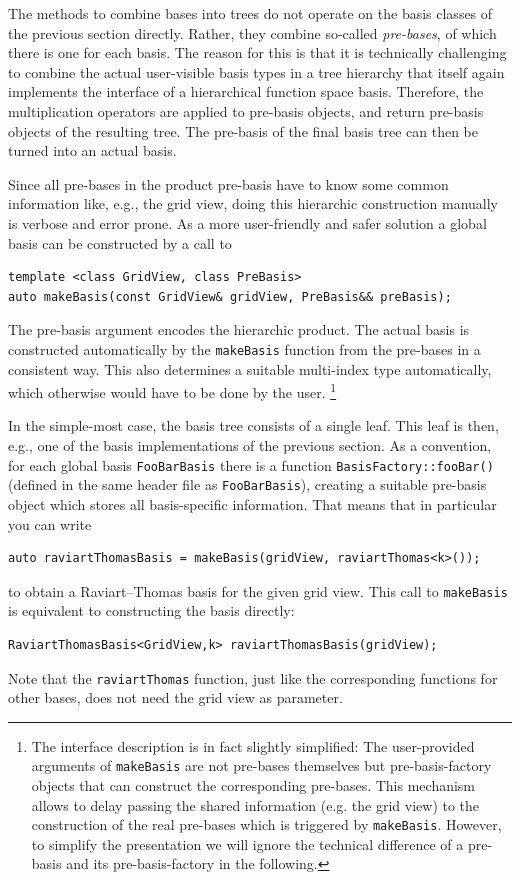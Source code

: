 \documentclass[a4paper,10pt,headings=normal,bibliography=totoc]{scrartcl}
\newcommand{\cpp}[1]{\lstinline[basicstyle=\ttfamily]!#1!}
\begin{document}
The methods to combine bases into trees do not operate on the basis classes of the previous section
directly.  Rather, they combine so-called \emph{pre-bases}, of which there is one for each basis.
The reason for this is
that it is technically challenging to combine the actual user-visible basis types in a
tree hierarchy that itself again implements the interface of a hierarchical function space basis.
Therefore, the multiplication operators are applied to pre-basis objects, and return pre-basis
objects of the resulting tree.
The pre-basis of the final basis tree can then be turned into an actual basis.

Since all pre-bases in the product pre-basis have to know some common information
like, e.g., the grid view, doing this hierarchic construction
manually is verbose and error prone. As a more user-friendly and safer solution
a global basis can be constructed by a call to
\begin{lstlisting}[style=Interface]
template <class GridView, class PreBasis>
auto makeBasis(const GridView& gridView, PreBasis&& preBasis);
\end{lstlisting}
The pre-basis argument encodes the hierarchic product.
The actual basis is constructed automatically by the
\cpp{makeBasis} function from the pre-bases in a consistent way.
This also determines a suitable multi-index type automatically,
which otherwise would have to be done by the user.
\footnote{The interface description is in fact slightly simplified:
The user-provided arguments of \cpp{makeBasis} are not pre-bases themselves
but pre-basis-factory objects that can construct the corresponding pre-bases.
This mechanism allows to delay passing the shared information
(e.g. the grid view) to the construction of the real pre-bases which is triggered
by \cpp{makeBasis}. However, to simplify the presentation
we will ignore the technical difference of a pre-basis
and its pre-basis-factory in the following.}

In the simple-most case, the basis tree consists of a single leaf.
This leaf is then, e.g., one of the basis implementations of the previous section.
As a convention, for each global basis
\cpp{FooBarBasis} there is a function \cpp{BasisFactory::fooBar()}
(defined in the same header file as \cpp{FooBarBasis}),
creating a suitable pre-basis object which
stores all basis-specific information.
That means that in particular you can write
\begin{lstlisting}[style=Example]
auto raviartThomasBasis = makeBasis(gridView, raviartThomas<k>());
\end{lstlisting}
to obtain a Raviart--Thomas basis for the given grid view.
This call to \cpp{makeBasis} is equivalent to constructing
the basis directly:
\begin{lstlisting}[style=Example]
RaviartThomasBasis<GridView,k> raviartThomasBasis(gridView);
\end{lstlisting}
Note that the \cpp{raviartThomas} function, just like the corresponding functions for other bases, does not need
the grid view as parameter.
\end{document}
